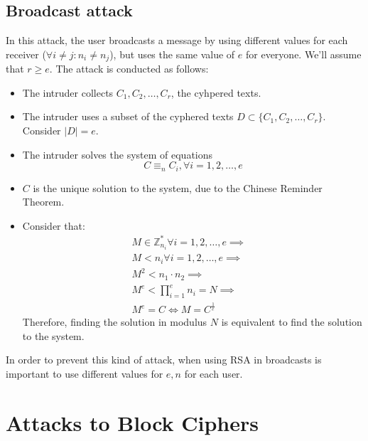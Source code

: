 \subsection{Broadcast attack}
In this attack, the user broadcasts a message by using different values for each receiver ($\forall i \neq j: n_{i} \neq n_{j}$), but uses the same value of $e$ for everyone. We'll assume that $r \geq e$.\newline
The attack is conducted as follows:
\begin{itemize}
    \item The intruder collects $C_{1}, C_{2}, \dots, C_{r}$, the cyhpered texts.
    \item The intruder uses a subset of the cyphered texts $D \subset \{C_{1}, C_{2}, \dots, C_{r}\}$. Consider $|D| = e$.
    \item The intruder solves the system of equations
    \[C \equiv_{n} C_{i}, \forall i = 1, 2, \dots, e\]
    \item $C$ is the unique solution to the system, due to the Chinese Reminder Theorem.
    \item Consider that:
    \begin{align*}
        M \in \mathbb{Z}_{n_{i}}^{*} \forall i = 1, 2, \dots, e \implies &\\
        M < n_{i} \forall i = 1, 2, \dots, e \implies &\\
        M^{2} < n_{1} \cdot n_{2} \implies &\\
        M^{e} < \prod_{i=1}^{e} n_{i} = N \implies &\\
        M^{e} = C \iff M = C^{\frac{1}{e}}
    \end{align*}
    Therefore, finding the solution in modulus $N$ is equivalent to find the solution to the system.
\end{itemize}
In order to prevent this kind of attack, when using RSA in broadcasts is important to use different values for $e,n$ for each user.

\section{Attacks to Block Ciphers}
